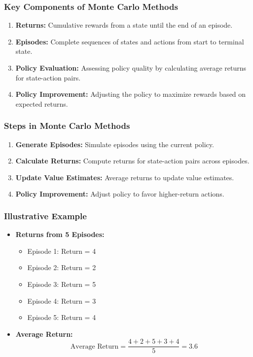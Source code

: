 \documentclass[aspectratio=169]{beamer}
\begin{document}
\begin{frame}[fragile]
    \frametitle{Key Components of Monte Carlo Methods}
    \begin{enumerate}
        \item \textbf{Returns:} Cumulative rewards from a state until the end of an episode.
        \item \textbf{Episodes:} Complete sequences of states and actions from start to terminal state.
        \item \textbf{Policy Evaluation:} Assessing policy quality by calculating average returns for state-action pairs.
        \item \textbf{Policy Improvement:} Adjusting the policy to maximize rewards based on expected returns.
    \end{enumerate}
\end{frame}

\begin{frame}[fragile]
    \frametitle{Steps in Monte Carlo Methods}
    \begin{enumerate}
        \item \textbf{Generate Episodes:} Simulate episodes using the current policy.
        \item \textbf{Calculate Returns:} Compute returns for state-action pairs across episodes.
        \item \textbf{Update Value Estimates:} Average returns to update value estimates.
        \item \textbf{Policy Improvement:} Adjust policy to favor higher-return actions.
    \end{enumerate}
\end{frame}

\begin{frame}[fragile]
    \frametitle{Illustrative Example}
    \begin{itemize}
        \item \textbf{Returns from 5 Episodes:}
        \begin{itemize}
            \item Episode 1: Return = 4
            \item Episode 2: Return = 2
            \item Episode 3: Return = 5
            \item Episode 4: Return = 3
            \item Episode 5: Return = 4
        \end{itemize}
        \item \textbf{Average Return:}
        \begin{equation}
            \text{Average Return} = \frac{4 + 2 + 5 + 3 + 4}{5} = 3.6
        \end{equation}
    \end{itemize}
\end{frame}
\end{document}
